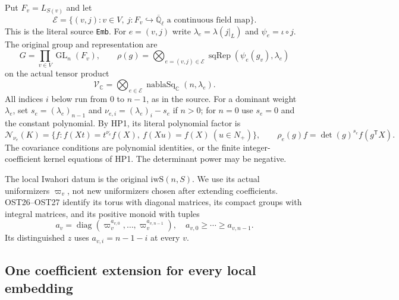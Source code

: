 \documentclass[11pt,a4paper]{article}
\numberwithin{equation}{section}
\theoremstyle{remark}\newtheorem{remark}[theorem]{Remark}
\begin{document}
Put $F_v=L_{S(v)}$ and let
\[
 \mathcal E=\{(v,\allowbreak{} j):v\in V,\ j:F_v\hookrightarrow
           \overline{\mathbb Q}_\ell\text{ a continuous field map}\}.
\]
This is the literal source \texttt{Emb}.  For $e=(v,\allowbreak{} j)$ write
$\lambda_e=\lambda(j|_L)$ and $\psi_e=\iota\circ j$.
The original group and representation are
\begin{equation}\label{eq:wrp-algrep}
 G=\prod_{v\in V}\operatorname{GL}_n(F_v),\qquad
 \rho(g)=\bigotimes_{e=(v,\allowbreak{} j)\in\mathcal E}
                 \operatorname{sqRep}(\psi_e(g_v),\lambda_e)
\end{equation}
on the actual tensor product
\[
 \mathcal V_{\mathbb C}=
       \bigotimes_{e\in\mathcal E}
                  \operatorname{nablaSq}_{\mathbb C}(n,\lambda_e).
\]
All indices $i$ below run from $0$ to $n-1$, as in the source.
For a dominant weight $\lambda_e$, set $s_e=(\lambda_e)_{n-1}$
and $\nu_{e,\allowbreak{} i}=(\lambda_e)_i-s_e$ if $n>0$; for $n=0$ use
$s_e=0$ and the constant polynomial.  By HP1, its literal
polynomial factor is
\begin{equation}\label{eq:wrp-polynomial}
 \mathcal N_{\nu_e}(K)=\{f:f(Xt)=t^{\nu_e}f(X),\
                                  f(Xu)=f(X)\ (u\in N_+)\},
 \qquad \rho_e(g)f=\det(g)^{s_e}f(g^{\mathsf T}X).
\end{equation}
The covariance conditions are polynomial identities, or the
finite integer-coefficient kernel equations of HP1.  The
determinant power may be negative.

The local Iwahori datum is the original $\mathrm{iwS}(n,\allowbreak{} S)$.
We use its actual uniformizers $\varpi_v$, not new uniformizers
chosen after extending coefficients.  OST26--OST27 identify its
torus with diagonal matrices, its compact groups with integral
matrices, and its positive monoid with tuples
\[
      a_v=\operatorname{diag}(\varpi_v^{a_{v,0}},\ldots,
                             \varpi_v^{a_{v,\allowbreak{} n-1}}),
                    \quad a_{v,0}\geq\cdots\geq a_{v,\allowbreak{} n-1}.
\]
Its distinguished $z$ uses $a_{v,\allowbreak{} i}=n-1-i$ at every $v$.

\subsection{One coefficient extension for every local embedding}

\end{document}
